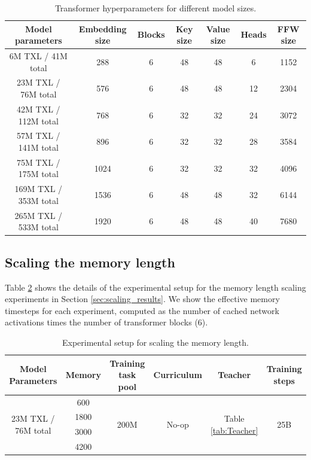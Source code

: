 \documentclass[11pt, a4paper, logo, copyright]{deepmind}
\begin{document}
\begin{appendix}
\begin{table}[h!]
\begin{center}
    \caption{Transformer hyperparameters for different model sizes.}
    \begin{tabular}{c|c|c|c|c|c|c}
    \label{tab:model_hparams}
      Model parameters & Embedding size & Blocks & Key size & Value size & Heads & FFW size\\
      \hline
      6M TXL / 41M total & 288 & 6 & 48 & 48 & 6 & 1152\\
      23M TXL / 76M total & 576 & 6 & 48 & 48 & 12 & 2304\\
      42M TXL / 112M total & 768 & 6 & 32 & 32 & 24 & 3072\\
      57M TXL / 141M total & 896 & 6 & 32 &32 & 28 & 3584\\
      75M TXL / 175M total & 1024 & 6 & 32 & 32 & 32 & 4096\\
      169M TXL / 353M total & 1536 & 6 & 48 & 48 & 32 & 6144\\
      265M TXL / 533M total & 1920 & 6 & 48 & 48 & 40 & 7680\\
    \end{tabular}
  \end{center}
\end{table}
\subsection{Scaling the memory length}
\label{app:memory-scaling}
Table \ref{tab:memory-scaling} shows the details of the experimental setup for the memory length scaling experiments in Section \ref{sec:scaling_results}. We show the effective memory timesteps for each experiment, computed as the number of cached network activations times the number of transformer blocks (6).
\begin{table}[h!]
  \begin{center}
    \caption{Experimental setup for scaling the memory length.}
    \begin{tabular}{c|c|c|c|c|c}
    \label{tab:memory-scaling}
      Model Parameters & Memory & Training task pool & Curriculum & Teacher & Training steps \\
      \hline
      \multirow{4}{*}{23M TXL / 76M total} & 600 & \multirow{4}{*}{200M} & \multirow{4}{*}{No-op} & \multirow{4}{*}{Table \ref{tab:Teacher}} & \multirow{4}{*}{25B}\\
      & 1800 &&&&\\
      & 3000 &&&&\\
      & 4200 &&&&\\
    \end{tabular}
  \end{center}
\end{table}

\end{appendix}
\end{document}
